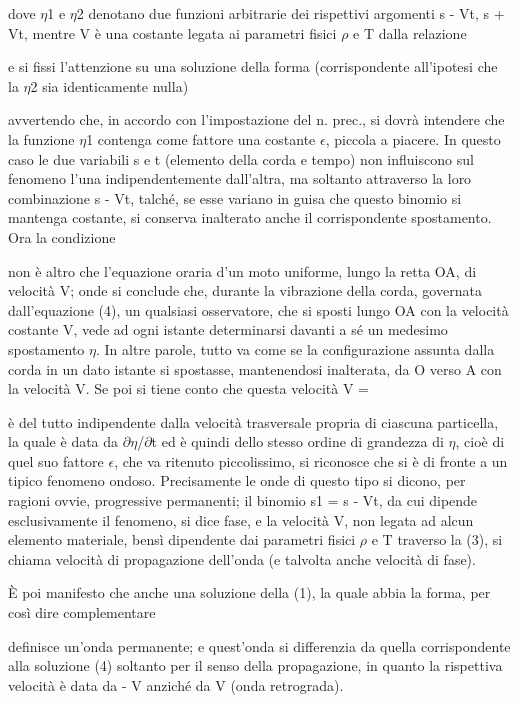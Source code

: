 \documentclass[a4paper]{article}
\begin{document}
dove $\eta$1 e $\eta$2 denotano due funzioni arbitrarie dei rispettivi argomenti s - Vt, s + Vt, mentre V è una costante legata ai parametri fisici $\rho$ e T dalla relazione

e si fissi l'attenzione su una soluzione della forma (corrispondente all'ipotesi che la $\eta$2 sia identicamente nulla)

avvertendo che, in accordo con l'impostazione del n. prec., si dovrà intendere che la funzione $\eta$1 contenga come fattore una costante $\epsilon$, piccola a piacere. In questo caso le due variabili s e t (elemento della corda e tempo) non influiscono sul fenomeno l'una indipendentemente dall'altra, ma soltanto attraverso la loro combinazione s - Vt, talché, se esse variano in guisa che questo binomio si mantenga costante, si conserva inalterato anche il corrispondente spostamento. Ora la condizione

non è altro che l'equazione oraria d'un moto uniforme, lungo la retta OA, di velocità V; onde si conclude che, durante la vibrazione della corda, governata dall'equazione (4), un qualsiasi osservatore, che si sposti lungo OA con la velocità costante V, vede ad ogni istante determinarsi davanti a sé un medesimo spostamento $\eta$. In altre parole, tutto va come se la configurazione assunta dalla corda in un dato istante si spostasse, mantenendosi inalterata, da O verso A con la velocità V. Se poi si tiene conto che questa velocità V =

è del tutto indipendente dalla velocità trasversale propria di ciascuna particella, la quale è data da $\partial$$\eta$/$\partial$t ed è quindi dello stesso ordine di grandezza di $\eta$, cioè di quel suo fattore $\epsilon$, che va ritenuto piccolissimo, si riconosce che si è di fronte a un tipico fenomeno ondoso. Precisamente le onde di questo tipo si dicono, per ragioni ovvie, progressive permanenti; il binomio s1 = s - Vt, da cui dipende esclusivamente il fenomeno, si dice fase, e la velocità V, non legata ad alcun elemento materiale, bensì dipendente dai parametri fisici $\rho$ e T traverso la (3), si chiama velocità di propagazione dell'onda (e talvolta anche velocità di fase).

È poi manifesto che anche una soluzione della (1), la quale abbia la forma, per così dire complementare

definisce un'onda permanente; e quest'onda si differenzia da quella corrispondente alla soluzione (4) soltanto per il senso della propagazione, in quanto la rispettiva velocità è data da - V anziché da V (onda retrograda).
\end{document}
